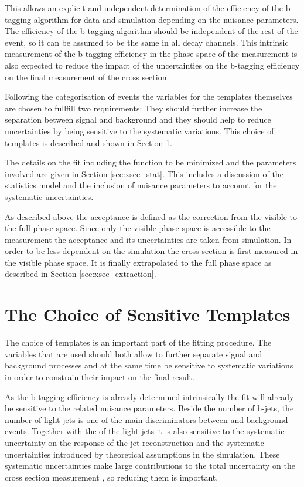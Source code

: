 This allows an explicit and independent determination of the efficiency of the b-tagging algorithm for data and simulation depending on the nuisance parameters. The efficiency of the b-tagging algorithm should be independent of the rest of the event, so it can be assumed to be the same in all \ttbar decay channels.
This intrinsic measurement of the b-tagging efficiency in the phase space of the measurement is also expected to reduce the impact of the uncertainties on the b-tagging efficiency on the final measurement of the \ttbar cross section.

Following the categorisation of events the variables for the templates themselves are chosen to fullfill two requirements:
They should further increase the separation between signal and background and they should help to reduce uncertainties by being sensitive to the systematic variations.
This choice of templates is described and shown in Section \ref{sec:xsec_templates}.

The details on the fit including the function to be minimized and the parameters involved are given in Section \ref{sec:xsec_stat}.
This includes a discussion of the statistics model and the inclusion of nuisance parameters to account for the systematic uncertainties.

As described above the acceptance is defined as the correction  from the visible to the full phase space.
Since only the visible phase space is accessible to the measurement the acceptance and its uncertainties are taken from simulation.
In order to be less dependent on the simulation the cross section is first measured in the visible phase space.
It is finally extrapolated to the full phase space as described in Section \ref{sec:xsec_extraction}.


\section{The Choice of Sensitive Templates}
\label{sec:xsec_templates}

The choice of templates is an important part of the fitting procedure.
The variables that are used should both allow to further separate signal and background processes and at the same time be sensitive to systematic
variations in order to constrain their impact on the final result.

As the b-tagging efficiency is already determined intrinsically the fit will already be sensitive to the related nuisance parameters.
Beside the number of b-jets, the number of light jets is one of the main discriminators between \ttbar and background events.
Together with the \pt of the light jets it is also sensitive to the systematic uncertainty on the response of the jet reconstruction and
the systematic uncertainties introduced by theoretical assumptions in the simulation.
These systematic uncertainties make large contributions to the total uncertainty on the \ttbar cross section measurement , so reducing them is important.

